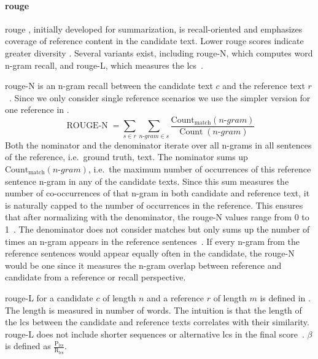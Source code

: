 
\paragraph{\ac{rouge}}
\ac{rouge} \citep{lin_rouge_2004}, initially developed for summarization, is recall-oriented and emphasizes coverage of reference content in the candidate text. 
Lower \ac{rouge} scores indicate greater diversity \citep{kurt_pehlivanoglu_comparative_2024}.
Several variants exist, including \ac{rouge}-N, which computes word n-gram recall, and \ac{rouge}-L, which measures the \ac{lcs}~\citep{zhou_paraphrase_2021,palivela_optimization_2021,kurt_pehlivanoglu_comparative_2024}. 

\ac{rouge}-N is an n-gram recall between the candidate text $c$ and the reference text $r$~\citep{lin_rouge_2004}.
Since we only consider single reference scenarios we use the simpler version for one reference in .
\begin{equation}
    \operatorname{ROUGE-N} = \sum_{s \in r}\sum_{n \text{-} gram \in s} \frac{\operatorname{Count_{match}}(n \text{-} gram)}{\operatorname{Count}(n \text{-} gram)}
\label{eq:rouge_n}
\end{equation}
Both the nominator and the denominator iterate over all n-grams in all sentences of the reference, i.e.\ ground truth, text.
The nominator sums up $\operatorname{Count_{match}}(n \text{-} gram)$, i.e.\ the maximum number of occurrences of this reference sentence n-gram in any of the candidate texts.
Since this sum measures the number of co-occurrences of that n-gram in both candidate and reference text, it is naturally capped to the number of occurrences in the reference.
This ensures that after normalizing with the denominator, the \ac{rouge}-N values range from 0 to 1~\citep{kurt_pehlivanoglu_comparative_2024}.
The denominator does not consider matches but only sums up the number of times an n-gram appears in the reference sentences~\citep{lin_rouge_2004}.
If every n-gram from the reference sentences would appear equally often in the candidate, the \ac{rouge}-N would be one since it measures the n-gram overlap between reference and candidate from a reference or recall perspective.

\ac{rouge}-L for a candidate $c$ of length $n$ and a reference $r$ of length $m$ is defined in .
The length is measured in number of words.
The intuition is that the length of the \ac{lcs} between the candidate and reference texts correlates with their similarity.
\ac{rouge}-L does not include shorter sequences or alternative \ac{lcs} in the final score~\citep{lin_rouge_2004}.
$\beta$ is defined as $\frac{\mathrm{P_{lcs}}}{\mathrm{R_{lcs}}}$.

